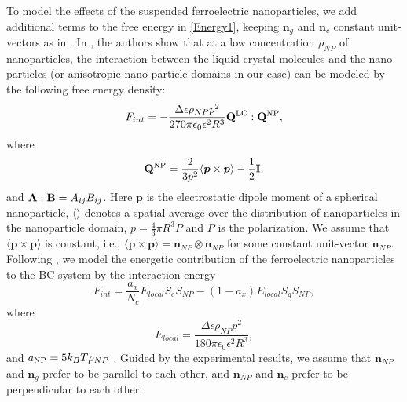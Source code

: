 \documentclass[reprint,amsfonts,amsmath,amssymb,aps,pre,floatfix,10pt]{revtex4-1}
\newcommand\n{\mathbf{n}}
\newcommand\Q{\mathbf{Q}}
\begin{document}
To model the effects of the suspended ferroelectric nanoparticles, we add additional terms to the free energy in \eqref{Energy1}, keeping  $\n_g$ and $\n_c$ constant unit-vectors as in \cite{patranabish2019one_37}. %
In \cite{lopatina2009theory_13}, the authors show that at a low concentration $\rho_{NP}$ of nanoparticles, the interaction between the liquid crystal molecules and the nano-particles (or anisotropic nano-particle domains in our case) can be modeled by the following free energy density:
\begin{equation}
F_{int} =  - \frac{\Delta \epsilon \rho_{NP} p^2}{270 \pi \epsilon_0 \epsilon^2 R^3} \Q^{\rm LC} : \Q^{\rm NP},
\end{equation}
where 
\begin{equation}
  \Q^{\rm NP} = \frac{2}{3 p^2}  \langle {\bm p} \times {\bm p} \rangle - \frac{1}{2} {\bf I}.
\end{equation}
and ${\bf A} : {\bf B} = A_{ij} B_{ij}$. Here ${\bm p}$ is the electrostatic dipole moment of a spherical nanoparticle, $\langle \rangle$ denotes a spatial average over the distribution of nanoparticles in the nanoparticle domain, $p = {\frac{4}{3} \pi R^3} P$ and $P$ is the polarization. 
 We assume that $\langle {\bm p} \times {\bm p} \rangle$ is constant, i.e., $\langle {\bm p} \times {\bm p} \rangle = \n_{NP}\otimes \n_{NP}$ for some constant unit-vector $\n_{NP}$. Following \cite{lopatina2009theory_13}, we model the energetic contribution of the ferroelectric nanoparticles to the BC system by the interaction energy
\begin{equation}
  F_{int} =  \frac{a_x}{N_c} E_{l o c a l} S_c S_{N P}-\left(1-a_x\right) E_{l o c a l} S_g S_{N P},
\end{equation}
where 
\begin{equation}
  E_{local} =  \frac{\Delta \epsilon \rho_{NP} p^2}{180 \pi \epsilon_0 \epsilon^2 R^3},
\end{equation}
and $a_{\rm NP} = 5 k_B T \rho_{NP}$ \cite{lopatina2009theory_13}. %
Guided by the experimental results, we assume that $\n_{NP}$ and $\n_g$ prefer to be parallel to each other, and $\n_{NP}$ and $\n_c$ prefer to be perpendicular to each other.
\end{document}
